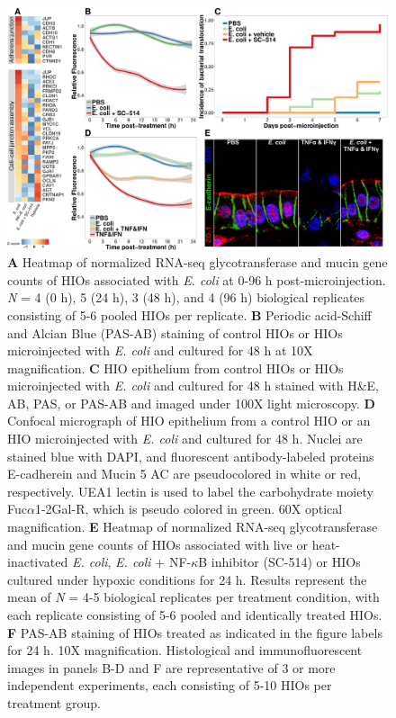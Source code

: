 \documentclass[9pt,lineo]{elife}
\begin{document}
\begin{figure}
\begin{fullwidth}
\centering
\includegraphics[width=0.8\linewidth]{./figures/figure7/figure7_multipanel.pdf}
\caption{\textbf{A} Heatmap of normalized RNA-seq glycotransferase and mucin gene counts of HIOs associated with \textit{E. coli} at 0-96 h post-microinjection. \textit{N} = 4 (0 h), 5 (24 h), 3 (48 h), and 4 (96 h) biological replicates consisting of 5-6 pooled HIOs per replicate. \textbf{B} Periodic acid-Schiff and Alcian Blue (PAS-AB) staining of control HIOs or HIOs microinjected with \textit{E. coli} and cultured for 48 h at 10X magnification. \textbf{C} HIO epithelium from control HIOs or HIOs microinjected with \textit{E. coli} and cultured for 48 h stained with H\&E, AB, PAS, or PAS-AB and imaged under 100X light microscopy. \textbf{D} Confocal micrograph of HIO epithelium from a control HIO or an HIO microinjected with \textit{E. coli} and cultured for 48 h. Nuclei are stained blue with DAPI, and fluorescent antibody-labeled proteins E-cadherein and Mucin 5 AC are pseudocolored in white or red, respectively. UEA1 lectin is used to label the carbohydrate moiety Fuc$\alpha$1-2Gal-R, which is pseudo colored in green. 60X optical magnification. \textbf{E} Heatmap of normalized RNA-seq glycotransferase and mucin gene counts of HIOs associated with live or heat-inactivated \textit{E. coli}, \textit{E. coli} + NF-$\kappa$B inhibitor (SC-514) or HIOs cultured under hypoxic conditions for 24 h. Results represent the mean of \textit{N} = 4-5 biological replicates per treatment condition, with each replicate consisting of 5-6 pooled and identically treated HIOs. \textbf{F} PAS-AB staining of HIOs treated as indicated in the figure labels for 24 h. 10X magnification. Histological and immunofluorescent images in panels B-D and F are representative of 3 or more independent experiments, each consisting of 5-10 HIOs per treatment group.}
\label{fig:fullwidth}
\end{fullwidth}
\end{figure}
\end{document}
